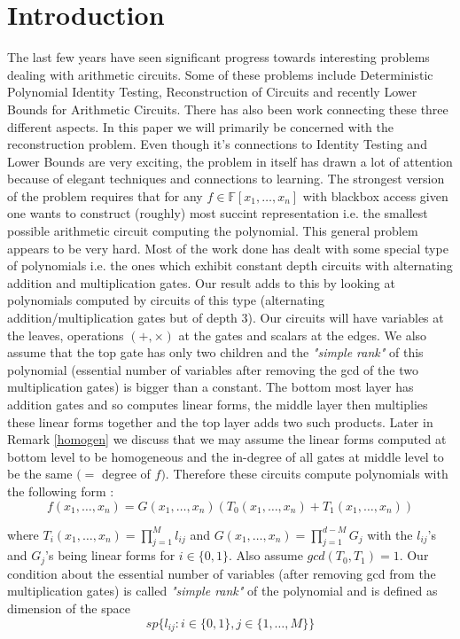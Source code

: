 \documentclass[letterpaper,USenglish,numberwithinsect]{lipics}
\newcommand{\F}{\mathbb{F}}
\begin{document}
\tableofcontents



\section{Introduction} \label{introduction}


The last few years have seen significant progress towards interesting problems dealing with arithmetic circuits.
Some of these problems include Deterministic Polynomial Identity Testing, Reconstruction of Circuits and
recently Lower Bounds for Arithmetic Circuits. There has also been work connecting these three different
aspects. In this paper we will primarily be concerned with the reconstruction problem.
Even though it's connections to Identity Testing and Lower Bounds are very exciting, the problem
in itself has drawn a lot of attention because of elegant techniques and connections to learning.
The strongest version of the problem requires that for any $f\in
\F[x_1,\ldots,x_n]$ with blackbox access given one wants to construct (roughly)
most succint representation i.e. the smallest possible arithmetic circuit computing the polynomial. This general
problem appears to be very hard. Most of the work done has dealt with some special type of polynomials i.e. the ones
which exhibit constant depth circuits with alternating addition and
multiplication gates. Our result adds to this by looking at polynomials computed by circuits of this type (alternating addition/multiplication
gates but of depth $3$). Our circuits will have variables at the leaves, operations $(+,\times)$ at the gates and scalars at the edges.
We also assume that the top gate has only two children and the \emph{"simple rank"} of this polynomial (essential number of variables
after removing the gcd of the two multiplication gates) is bigger than a constant. The bottom most layer has addition gates and so computes linear forms, the middle layer then multiplies these
linear forms together and the top layer adds two such products. Later in Remark \ref{homogen} we discuss
that we may assume the linear forms computed at bottom level to be homogeneous and the in-degree of all gates at
middle level to be the same $(=$ degree of $f)$. Therefore these circuits compute polynomials with the following form :
\[
 f(x_1,\ldots,x_n) = G(x_1,\ldots,x_n)(T_0(x_1,\ldots,x_n) + T_1 (x_1,\ldots,x_n))
\]

where $T_i(x_1,\ldots,x_n) = \prod\limits_{j=1}^M l_{ij}$ and $G(x_1,\ldots,x_n) = \prod\limits_{j=1}^{d-M}G_j$ with the $l_{ij}$'s and $G_j$'s being linear forms
for $i\in \{0,1\}$. Also assume $gcd(T_0,T_1)=1$. Our condition about the essential number of variables (after removing gcd from
the multiplication gates) is called \emph{"simple rank"} of the polynomial and is defined as
dimension of the space
\[
 sp\{l_{ij} : i\in \{0,1\}, j\in \{1,\ldots,M\}\}
\]
\end{document}
